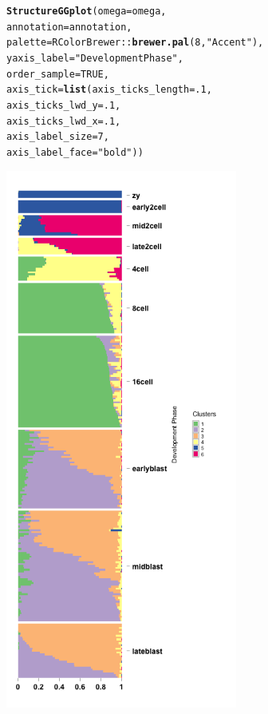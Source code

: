 \documentclass[12pt]{article}\usepackage[]{graphicx}\usepackage[usenames,dvipsnames]{color}
\makeatletter
\newcommand{\hlnum}[1]{\textcolor[rgb]{0.686,0.059,0.569}{#1}}%
\newcommand{\hlstr}[1]{\textcolor[rgb]{0.192,0.494,0.8}{#1}}%
\newcommand{\hlopt}[1]{\textcolor[rgb]{0,0,0}{#1}}%
\newcommand{\hlstd}[1]{\textcolor[rgb]{0.345,0.345,0.345}{#1}}%
\newcommand{\hlkwc}[1]{\textcolor[rgb]{0.333,0.667,0.333}{#1}}%
\newcommand{\hlkwd}[1]{\textcolor[rgb]{0.737,0.353,0.396}{\textbf{#1}}}%
\newenvironment{kframe}{%
 \def\at@end@of@kframe{}%
 \ifinner\ifhmode%
  \def\at@end@of@kframe{\end{minipage}}%
  \begin{minipage}{\columnwidth}%
 \fi\fi%
 \def\FrameCommand##1{\hskip\@totalleftmargin \hskip-\fboxsep
 \colorbox{shadecolor}{##1}\hskip-\fboxsep
     \hskip-\linewidth \hskip-\@totalleftmargin \hskip\columnwidth}%
 \MakeFramed {\advance\hsize-\width
   \@totalleftmargin\z@ \linewidth\hsize
   \@setminipage}}%
 {\par\unskip\endMakeFramed%
 \at@end@of@kframe}
\newenvironment{knitrout}{}{} %
\makeatother
\begin{document}
\begin{figure}[h]
\begin{center}
\begin{knitrout}
\color{fgcolor}\begin{kframe}
\begin{alltt}
\hlkwd{StructureGGplot}\hlstd{(}\hlkwc{omega} \hlstd{= omega,}
                \hlkwc{annotation} \hlstd{= annotation,}
                \hlkwc{palette} \hlstd{= RColorBrewer}\hlopt{::}\hlkwd{brewer.pal}\hlstd{(}\hlnum{8}\hlstd{,} \hlstr{"Accent"}\hlstd{),}
                \hlkwc{yaxis_label} \hlstd{=} \hlstr{"Development Phase"}\hlstd{,}
                \hlkwc{order_sample} \hlstd{=} \hlnum{TRUE}\hlstd{,}
                \hlkwc{axis_tick} \hlstd{=} \hlkwd{list}\hlstd{(}\hlkwc{axis_ticks_length} \hlstd{=} \hlnum{.1}\hlstd{,}
                                 \hlkwc{axis_ticks_lwd_y} \hlstd{=} \hlnum{.1}\hlstd{,}
                                 \hlkwc{axis_ticks_lwd_x} \hlstd{=} \hlnum{.1}\hlstd{,}
                                 \hlkwc{axis_label_size} \hlstd{=} \hlnum{7}\hlstd{,}
                                 \hlkwc{axis_label_face} \hlstd{=} \hlstr{"bold"}\hlstd{))}
\end{alltt}
\end{kframe}
\includegraphics[width=3in,height=7in]{figure/plot_topic_deng-1} 

\end{knitrout}
\end{center}
\end{figure}
\end{document}
